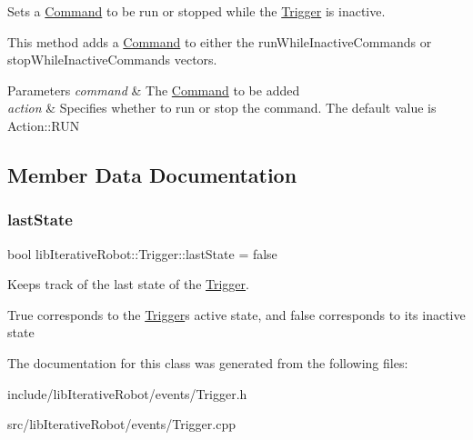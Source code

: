 Sets a \mbox{\hyperlink{classlib_iterative_robot_1_1_command}{Command}} to be run or stopped while the \mbox{\hyperlink{classlib_iterative_robot_1_1_trigger}{Trigger}} is inactive. 

This method adds a \mbox{\hyperlink{classlib_iterative_robot_1_1_command}{Command}} to either the run\+While\+Inactive\+Commands or stop\+While\+Inactive\+Commands vectors.


\begin{DoxyParams}{Parameters}
{\em command} & The \mbox{\hyperlink{classlib_iterative_robot_1_1_command}{Command}} to be added \\
\hline
{\em action} & Specifies whether to run or stop the command. The default value is Action\+::\+R\+UN \\
\hline
\end{DoxyParams}


\subsection{Member Data Documentation}
\mbox{\label{classlib_iterative_robot_1_1_trigger_ae053034579fc72b555c2052c37c1e410}} 
\subsubsection{\texorpdfstring{lastState}{lastState}}
{\footnotesize\ttfamily bool lib\+Iterative\+Robot\+::\+Trigger\+::last\+State = false\hspace{0.3cm}{\ttfamily [private]}}



Keeps track of the last state of the \mbox{\hyperlink{classlib_iterative_robot_1_1_trigger}{Trigger}}. 

True corresponds to the \mbox{\hyperlink{classlib_iterative_robot_1_1_trigger}{Trigger}}\textquotesingle{}s active state, and false corresponds to its inactive state

 

The documentation for this class was generated from the following files\+:\begin{DoxyCompactItemize}
\item 
include/lib\+Iterative\+Robot/events/Trigger.\+h\item 
src/lib\+Iterative\+Robot/events/Trigger.\+cpp\end{DoxyCompactItemize}
